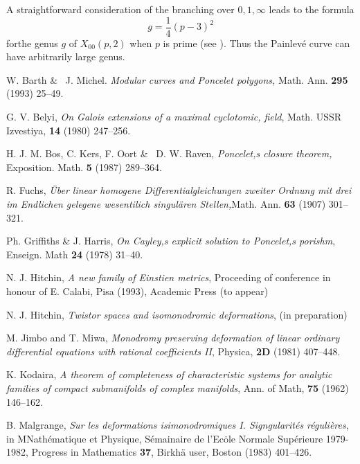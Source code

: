 \begin{remark*}
A straightforward consideration of the branching over $0,1,\infty$ leads to the formula
$$
g = \dfrac{1}{4}(p-3)^{2}
$$
for\pageoriginale the genus $g$ of $X_{00}(p,2)$ when $p$ is prime (see \cite{art7-key1}). Thus the Painlev\'e curve can have arbitrarily large genus.
\end{remark*}

\begin{thebibliography}{99}
 W. Barth \& \ J. Michel. \textit{Modular curves and Poncelet polygons,} Math. Ann. {\bf 295} (1993) 25--49.

 G. V. Belyi, \textit{On Galois extensions of a maximal cyclotomic, field}, Math. USSR Izvestiya,
{\bf 14} (1980) 247--256.

 H. J. M. Bos, C. Kers, F. Oort \& \ D. W. Raven, \textit{Poncelet,s closure theorem,} Exposition. Math. {\bf 5} (1987) 289--364.

 R. Fuchs, \textit{\"Uber linear homogene Differentialgleichungen zweiter Ordnung mit drei im Endlichen gelegene wesentilich singul\"aren Stellen,}Math. Ann. {\bf 63} (1907) 301--321.

 Ph. Griffiths \& J. Harris, \textit{On Cayley,s explicit solution to Poncelet,s porishm}, Enseign. Math {\bf 24} (1978) 31--40.

 N. J. Hitchin, \textit{A new family of Einstien metrics}, Proceeding of conference in honour of E. Calabi, Pisa (1993), Academic Press (to appear)

 N. J. Hitchin, \textit{Twistor spaces and isomonodromic deformations}, (in preparation)

 M. Jimbo and T. Miwa, \textit{Monodromy preserving deformation of linear ordinary differential equations with rational coefficients II}, Physica, {\bf 2D} (1981) 407--448.

 K. Kodaira, \textit{A theorem of completeness of characteristic systems for analytic families of compact submanifolds of complex manifolds}, Ann. of Math, {\bf 75} (1962) 146--162.
 
 B. Malgrange, \textit{Sur les deformations isimonodromiques I. Signgularit\'es r\'eguli\`eres}, in MNath\'ematique et Physique, S\'emainaire de l'Ec\.{o}le Normale Sup\'erieure 1979-1982, Progress in Mathematics
{\bf 37}, Birkh\"a user, Boston (1983) 401--426.


\end{thebibliography}
